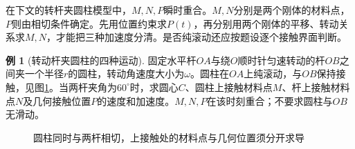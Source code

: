 \documentclass[11pt,openany,fontset=fandol]{ctexbook}
\theoremstyle{definition}\newtheorem{example}{例}[chapter]\newtheorem{exercise}{习题}[chapter]
\begin{document}
在下文的转杆夹圆柱模型中，$M,N,P$瞬时重合。$M,N$分别是两个刚体的材料点，$P$则由相切条件确定。先用位置约束求$P(t)$，再分别用两个刚体的平移、转动关系求$M,N$，才能把三种加速度分清。是否纯滚动还应按题设逐个接触界面判断。


\par\medskip\noindent\begin{minipage}{\textwidth}
\begin{example}[转动杆夹圆柱的四种运动]\label{mp2:rev:wedgecyl}
固定水平杆$OA$与绕$O$顺时针匀速转动的杆$OB$之间夹一个半径$r$的圆柱，转动角速度大小为$\omega$。圆柱在$OA$上纯滚动，与$OB$保持接触，见图\ref{mp2:fig:rev:wedgecyl-q}。当两杆夹角为$60^\circ$时，求圆心$C$、圆柱上接触材料点$M$、杆上接触材料点$N$及几何接触位置$P$的速度和加速度。$M,N,P$在该时刻重合；不要求圆柱与$OB$无滑动。
\end{example}

\begin{figure}[H]\centering
{}
\caption{圆柱同时与两杆相切，上接触处的材料点与几何位置须分开求导}\label{mp2:fig:rev:wedgecyl-q}
\end{figure}
\end{minipage}\par\medskip
\end{document}

